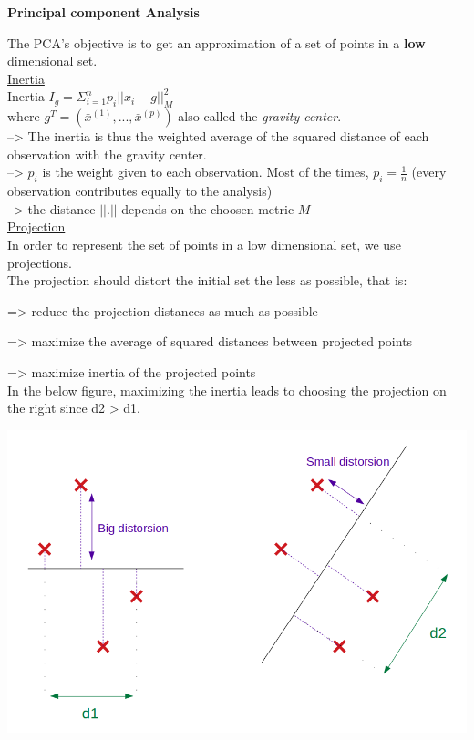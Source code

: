 {\fontsize{12pt}{22pt} \textbf{Principal component Analysis}\par}

\vspace{5mm}

The PCA's objective is to get an approximation of a set of points in a \textbf{low} dimensional set. \\

\underline{Inertia} \\

Inertia $I_g = \Sigma_{i=1}^n p_i ||x_i - g||_M^2$ \\

where $g^T = (\bar{x}^{(1)},...,\bar{x}^{(p)})$ also called the \textit{gravity center}. \\

--> The inertia is thus the weighted average of the squared distance of each observation with the gravity center. \\

--> $p_i$ is the weight given to each observation. Most of the times, $p_i = \frac{1}{n}$ (every observation contributes equally to the analysis) \\

-->  the distance $||.||$ depends on the choosen metric $M$ \\

\underline{Projection} \\

In order to represent the set of points in a low dimensional set, we use projections. \\

The projection should distort the initial set the less as possible, that is:

=> reduce the projection distances as much as possible

=> maximize the average of squared distances between projected points

=> maximize inertia of the projected points \\

In the below figure, maximizing the inertia leads to choosing the projection on the right since d2 > d1.

\begin{center}
\includegraphics[scale=0.4]{PCA_projections.png}
\end{center}

